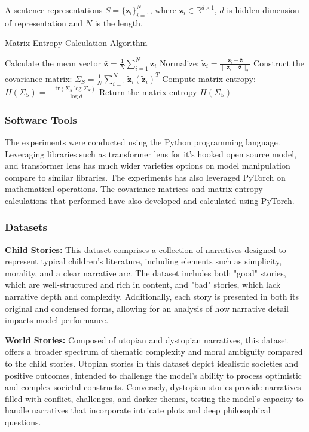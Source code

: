 \documentclass{article}
\begin{document}
A sentence representations \( S = \{\mathbf{z}_i\}_{i=1}^N \), where \( \mathbf{z}_i \in \mathbb{R}^{d \times 1} \), \( d \) is hidden dimension of representation and \( N \) is the length.

\begin{algorithm}[H]
\caption{Matrix Entropy Calculation Algorithm}
\label{alg:matrix_entropy}
\begin{algorithmic}[1]
\State Calculate the mean vector $\bar{\mathbf{z}} = \frac{1}{N} \sum_{i=1}^N \mathbf{z}_i$
\State Normalize: $\tilde{\mathbf{z}}_i = \frac{\mathbf{z}_i - \bar{\mathbf{z}}}{\|\mathbf{z}_i - \bar{\mathbf{z}}\|_2}$
\State Construct the covariance matrix: $\Sigma_S = \frac{1}{N} \sum_{i=1}^N \tilde{\mathbf{z}}_i (\tilde{\mathbf{z}}_i)^T$
\State Compute matrix entropy: $H(\Sigma_S) = -\frac{\text{tr}(\Sigma_S \log \Sigma_S)}{\log d}$
\State Return the matrix entropy $H(\Sigma_S)$
\end{algorithmic}
\end{algorithm}


\subsubsection{Software Tools} The experiments were conducted using the Python programming language. Leveraging libraries such as transformer lens \cite{nanda2022} for it's hooked open source model, and transformer lens has much wider varieties options on model manipulation compare to similar libraries. The experiments has also leveraged PyTorch \cite{paszke2019} on mathematical operations. The covariance matrices and matrix entropy calculations that performed have also developed and calculated using PyTorch.

\subsubsection{Datasets} 
\textbf{Child Stories:} This dataset comprises a collection of narratives designed to represent typical children's literature, including elements such as simplicity, morality, and a clear narrative arc. The dataset includes both "good" stories, which are well-structured and rich in content, and "bad" stories, which lack narrative depth and complexity. Additionally, each story is presented in both its original and condensed forms, allowing for an analysis of how narrative detail impacts model performance.

\textbf{World Stories:} Composed of utopian and dystopian narratives, this dataset offers a broader spectrum of thematic complexity and moral ambiguity compared to the child stories. Utopian stories in this dataset depict idealistic societies and positive outcomes, intended to challenge the model's ability to process optimistic and complex societal constructs. Conversely, dystopian stories provide narratives filled with conflict, challenges, and darker themes, testing the model's capacity to handle narratives that incorporate intricate plots and deep philosophical questions.
\end{document}
